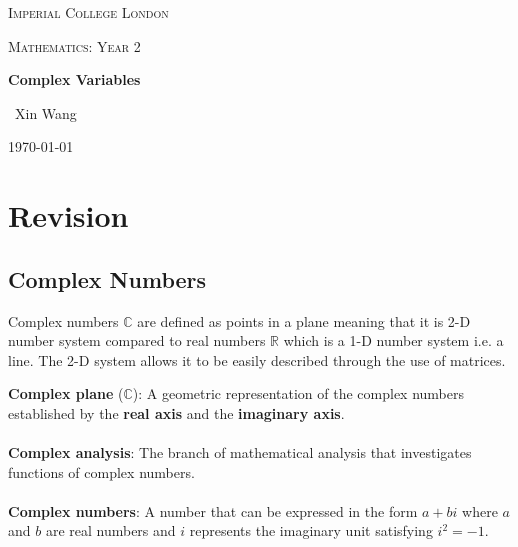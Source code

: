 \documentclass[10pt,a4paper]{article}
\begin{document}
\begin{titlepage}
	\centering
	{\scshape\LARGE Imperial College London \par}
	\vspace{1cm}
	{\scshape\Large Mathematics: Year 2\par}
	\vspace{1.5cm}
	{\huge\bfseries Complex Variables\par}
	\vspace{2cm}
	{\Large\ Xin Wang }
	\vfill
	{\large \today\par}
\end{titlepage}

\begin{abstract}
Complex variables, just like Real and Natural numbers, were invented as a way to make calculations
simpler. While numerical analysis is used in modern day, complex variables still plays an important
role in Electrical Engineering as means to simplify calculations as seen with Fourier and Laplace. \par 

Many of the theory builds on existing Complex Numbers covered previously - a revision topic focuses
on the abstract meaning of complex numbers.
\end{abstract}

\tableofcontents
\pagebreak

\section{Revision}

\subsection{Complex Numbers}

Complex numbers $\mathbb{C}$ are defined as points in a plane meaning that it is 2-D number system
compared to real numbers $\mathbb{R}$ which is a 1-D number system i.e. a line. The 2-D system
allows it to be easily described through the use of matrices.

\begin{tcolorbox}[breakable,colback=white]
\textbf{Complex plane} ($\mathbb{C}$): A geometric representation of the complex
numbers established by the \textbf{real axis} and the \textbf{imaginary axis}.
\\
\\
\textbf{Complex analysis}: The branch of mathematical analysis that investigates functions of
complex numbers.
\\
\\
\textbf{Complex numbers}: A number that can be expressed in the form $a+bi$ where $a$ and $b$ are
real numbers and $i$ represents the imaginary unit satisfying $i^2=-1$.
\end{tcolorbox}
\end{document}
